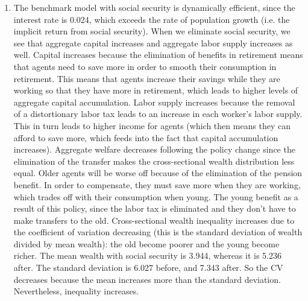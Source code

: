 \documentclass[12pt]{article}
\begin{document}
\begin{enumerate}
   \item The benchmark model with social security is dynamically efficient, since the interest rate is 0.024, which exceeds the rate of population growth (i.e. the implicit return from social security). When we eliminate social security, we see that aggregate capital increases and aggregate labor supply increases as well. Capital increases because the elimination of benefits in retirement means that agents need to save more in order to smooth their consumption in retirement. This means that agents increase their savings while they are working so that they have more in retirement, which leads to higher levels of aggregate capital accumulation. Labor supply increases because the removal of a distortionary labor tax leads to an increase in each worker's labor supply. This in turn leads to higher income for agents (which then means they can afford to save more, which feeds into the fact that capital accumulation increases). Aggregate welfare decreases following the policy change since the elimination of the transfer makes the cross-sectional wealth distribution less equal. Older agents will be worse off because of the elimination of the pension benefit. In order to compensate, they must save more when they are working, which trades off with their consumption when young. The young benefit as a result of this policy, since the labor tax is eliminated and they don't have to make transfers to the old. Cross-sectional wealth inequality increases due to the coefficient of variation decreasing (this is the standard deviation of wealth divided by mean wealth): the old become poorer and the young become richer. The mean wealth with social security is 3.944, whereas it is 5.236 after. The standard deviation is 6.027 before, and 7.343 after. So the CV decreases because the mean increases more than the standard deviation. Nevertheless, inequality increases.

\end{enumerate}
\end{document}

